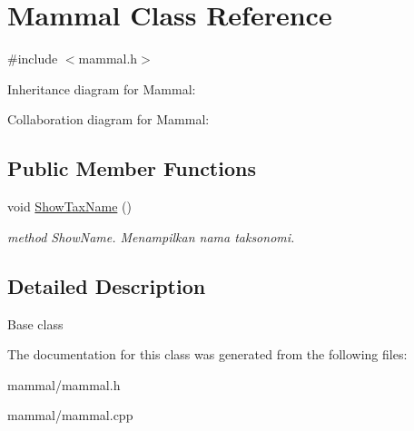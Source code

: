 \hypertarget{classMammal}{}\section{Mammal Class Reference}
\label{classMammal}


{\ttfamily \#include $<$mammal.\+h$>$}



Inheritance diagram for Mammal\+:


Collaboration diagram for Mammal\+:
\subsection*{Public Member Functions}
\begin{DoxyCompactItemize}
\item 
void \hyperlink{classMammal_aaeded9abff06a8944b8e192c6ee5aff4}{Show\+Tax\+Name} ()\hypertarget{classMammal_aaeded9abff06a8944b8e192c6ee5aff4}{}\label{classMammal_aaeded9abff06a8944b8e192c6ee5aff4}

\begin{DoxyCompactList}\small\item\em method Show\+Name. Menampilkan nama taksonomi. \end{DoxyCompactList}\end{DoxyCompactItemize}


\subsection{Detailed Description}
Base class 

The documentation for this class was generated from the following files\+:\begin{DoxyCompactItemize}
\item 
mammal/mammal.\+h\item 
mammal/mammal.\+cpp\end{DoxyCompactItemize}
